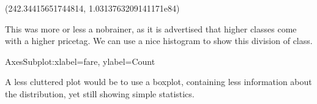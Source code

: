 \documentclass[letterpaper,10pt,english]{jupyterBook}
\begin{document}
\begin{sphinxVerbatim}[commandchars=\\\{\}]
(242.34415651744814, 1.0313763209141171e\PYGZhy{}84)
\end{sphinxVerbatim}

\sphinxAtStartPar
This was more or less a no\sphinxhyphen{}brainer, as it is advertised that higher classes come with a higher pricetag.
We can use a nice histogram to show this division of class.

\begin{sphinxVerbatim}[commandchars=\\\{\}]
\PYG{p}{[}\PYG{p}{]}     
\end{sphinxVerbatim}

\begin{sphinxVerbatim}[commandchars=\\\{\}]
\PYGZlt{}AxesSubplot:xlabel=\PYGZsq{}fare\PYGZsq{}, ylabel=\PYGZsq{}Count\PYGZsq{}\PYGZgt{}
\end{sphinxVerbatim}

\noindent{}

\sphinxAtStartPar
A less cluttered plot would be to use a boxplot, containing less information about the distribution, yet still showing simple statistics.

\begin{sphinxVerbatim}[commandchars=\\\{\}]
  \PYG{p}{[}\PYG{p}{]}  
\end{sphinxVerbatim}
\end{document}
